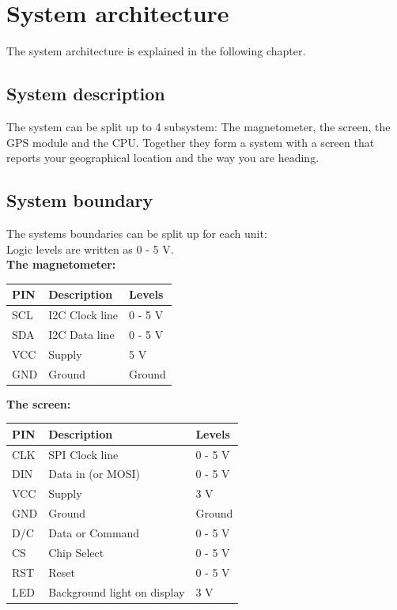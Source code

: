 \chapter{System architecture}
The system architecture is explained in the following chapter.

\section{System description}
The system can be split up to 4 subsystem: The magnetometer, the screen, the GPS module and the CPU. Together they form a system with a screen that reports your geographical location and the way you are heading. 

\section{System boundary}
The systems boundaries can be split up for each unit:\\
Logic levels are written as 0 - 5 V.\\

\textbf{The magnetometer:}\\
\begin{table}[H]
\centering
    \begin{tabular}{|l|l|l|}
    \hline
    PIN & Description    & Levels  \\ \hline
    SCL & I2C Clock line & 0 - 5 V \\ \hline
    SDA & I2C Data line  & 0 - 5 V \\ \hline
    VCC & Supply         & 5 V     \\ \hline
    GND & Ground         & Ground  \\ \hline
    \end{tabular}
\end{table}

\textbf{The screen:}\\
\begin{table}[H]
\centering
    \begin{tabular}{|l|l|l|}
    \hline
    PIN & Description    & Levels  \\ \hline
    CLK & SPI Clock line & 0 - 5 V \\ \hline
    DIN & Data in (or MOSI)  & 0 - 5 V \\ \hline
    VCC & Supply         & 3 V     \\ \hline
    GND & Ground         & Ground  \\ \hline
    D/C & Data or Command & 0 - 5 V \\ \hline
    CS  & Chip Select    & 0 - 5 V \\ \hline
    RST & Reset			 & 0 - 5 V \\ \hline
    LED & Background light on display & 3 V \\ \hline
    \end{tabular}
\end{table}

